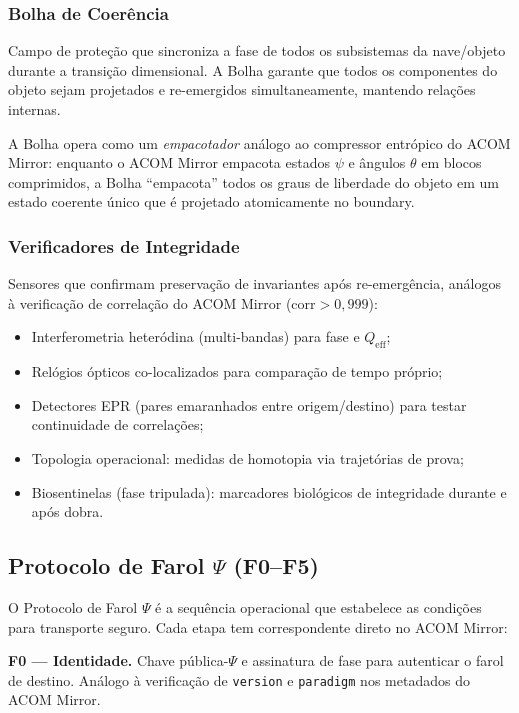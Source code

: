 \documentclass[12pt,a4paper]{article}
\newcommand{\Qeff}{Q_{\text{eff}}}
\begin{document}
\subsubsection{Bolha de Coerência}

Campo de proteção que sincroniza a fase de todos os subsistemas
da nave/objeto durante a transição dimensional. A Bolha garante
que todos os componentes do objeto sejam projetados e
re-emergidos simultaneamente, mantendo relações internas.

A Bolha opera como um \textit{empacotador} análogo ao
compressor entrópico do ACOM Mirror: enquanto o ACOM Mirror
empacota estados $\psi$ e ângulos $\theta$ em blocos
comprimidos, a Bolha ``empacota'' todos os graus de liberdade
do objeto em um estado coerente único que é projetado
atomicamente no boundary.

\subsubsection{Verificadores de Integridade}

Sensores que confirmam preservação de invariantes após
re-emergência, análogos à verificação de correlação do ACOM
Mirror ($\text{corr} > 0{,}999$):

\begin{itemize}[nosep]
\item Interferometria heteródina (multi-bandas) para fase e
  $\Qeff$;
\item Relógios ópticos co-localizados para comparação de tempo
  próprio;
\item Detectores EPR (pares emaranhados entre origem/destino)
  para testar continuidade de correlações;
\item Topologia operacional: medidas de homotopia via
  trajetórias de prova;
\item Biosentinelas (fase tripulada): marcadores biológicos de
  integridade durante e após dobra.
\end{itemize}

\subsection{Protocolo de Farol $\Psi$ (F0--F5)}

O Protocolo de Farol $\Psi$ é a sequência operacional que
estabelece as condições para transporte seguro. Cada etapa
tem correspondente direto no ACOM Mirror:

\textbf{F0 --- Identidade.} Chave pública-$\Psi$ e assinatura
de fase para autenticar o farol de destino. Análogo à
verificação de \texttt{version} e \texttt{paradigm} nos
metadados do ACOM Mirror.
\end{document}
